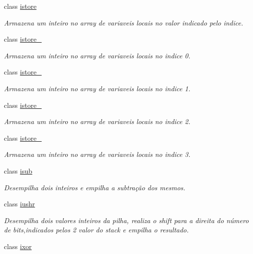 \begin{DoxyCompactItemize}
class \hyperlink{class_instruction_impl_1_1istore}{istore}
\begin{DoxyCompactList}\small\item\em Armazena um inteiro no array de variaveis locais no valor indicado pelo indice. \end{DoxyCompactList}\item 
class \hyperlink{class_instruction_impl_1_1istore__0}{istore\+\_}
\begin{DoxyCompactList}\small\item\em Armazena um inteiro no array de variaveis locais no indice 0. \end{DoxyCompactList}\item 
class \hyperlink{class_instruction_impl_1_1istore__1}{istore\+\_}
\begin{DoxyCompactList}\small\item\em Armazena um inteiro no array de variaveis locais no indice 1. \end{DoxyCompactList}\item 
class \hyperlink{class_instruction_impl_1_1istore__2}{istore\+\_}
\begin{DoxyCompactList}\small\item\em Armazena um inteiro no array de variaveis locais no indice 2. \end{DoxyCompactList}\item 
class \hyperlink{class_instruction_impl_1_1istore__3}{istore\+\_}
\begin{DoxyCompactList}\small\item\em Armazena um inteiro no array de variaveis locais no indice 3. \end{DoxyCompactList}\item 
class \hyperlink{class_instruction_impl_1_1isub}{isub}
\begin{DoxyCompactList}\small\item\em Desempilha dois inteiros e empilha a subtração dos mesmos. \end{DoxyCompactList}\item 
class \hyperlink{class_instruction_impl_1_1iushr}{iushr}
\begin{DoxyCompactList}\small\item\em Desempilha dois valores inteiros da pilha, realiza o shift para a direita do número de bits,indicados pelos 2 valor do stack e empilha o resultado. \end{DoxyCompactList}\item 
class \hyperlink{class_instruction_impl_1_1ixor}{ixor}

\end{DoxyCompactItemize}
